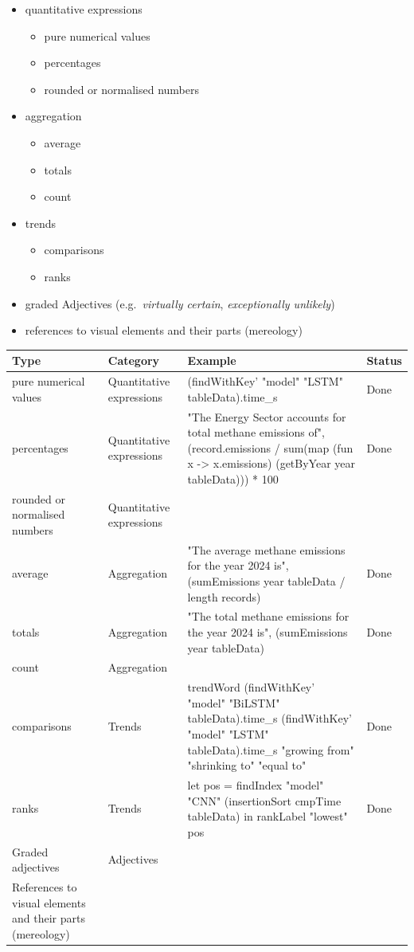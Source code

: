 \begin{itemize}
\item quantitative expressions
\begin{itemize}
   \item pure numerical values
   \item percentages
   \item rounded or normalised numbers
\end{itemize}
\item aggregation
\begin{itemize}
   \item average
   \item totals
   \item count
\end{itemize}
\item trends
\begin{itemize}
   \item comparisons
   \item ranks
\end{itemize}
\item graded Adjectives (e.g.~\emph{virtually certain}, \emph{exceptionally unlikely})
\item references to visual elements and their parts (mereology)
\end{itemize}

\begin{table}[!ht]
   \centering
   \tiny
   \begin{tabular}{p{2cm}p{1.3cm}p{6.7cm}p{2cm}}
      \toprule
      Type & Category & Example & Status \\
      \midrule
      pure numerical values & Quantitative expressions & (findWithKey' "model" "LSTM" tableData).time\_s & Done \\
      percentages & Quantitative expressions &  "The Energy Sector accounts for total methane emissions of", (record.emissions / sum(map (fun x -> x.emissions) (getByYear year tableData))) * 100 & Done \\
      rounded or normalised numbers & Quantitative expressions & ~ & ~ \\
      average & Aggregation & "The average methane emissions for the year 2024 is", (sumEmissions year tableData / length records) & Done \\
      totals & Aggregation & "The total methane emissions for the year 2024 is", (sumEmissions year tableData) & Done \\
      count & Aggregation & ~ & ~ \\
      comparisons & Trends & trendWord (findWithKey' "model" "BiLSTM" tableData).time\_s (findWithKey' "model" "LSTM" tableData).time\_s "growing from" "shrinking to" "equal to" & Done \\
      ranks & Trends & let pos = findIndex "model" "CNN" (insertionSort cmpTime tableData) in rankLabel "lowest" pos & Done \\
      Graded adjectives  & Adjectives & ~ & ~ \\
      References to visual elements and their parts (mereology) & ~ & ~ & ~ \\
      \bottomrule
   \end{tabular}
\end{table}

